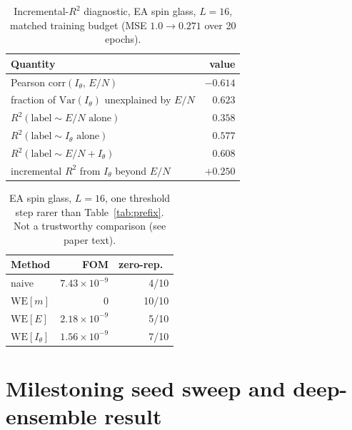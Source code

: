 \documentclass[11pt]{article}
\begin{document}
\begin{table}[h]
	\centering\small
	\caption{Incremental-$R^2$ diagnostic, EA spin glass, $L=16$, matched training budget
		(MSE $1.0\to0.271$ over 20 epochs).}
	\label{tab:diagnostic}
	\begin{tabular}{lr}
		\toprule
		Quantity & value \\
		\midrule
		Pearson corr$(I_\theta,\,E/N)$ & $-0.614$ \\
		fraction of $\mathrm{Var}(I_\theta)$ unexplained by $E/N$ & $0.623$ \\
		$R^2(\text{label}\sim E/N\text{ alone})$ & $0.358$ \\
		$R^2(\text{label}\sim I_\theta\text{ alone})$ & $0.577$ \\
		$R^2(\text{label}\sim E/N+I_\theta)$ & $0.608$ \\
		incremental $R^2$ from $I_\theta$ beyond $E/N$ & $+0.250$ \\
		\bottomrule
	\end{tabular}
\end{table}

\begin{table}[h]
	\centering\small
	\caption{EA spin glass, $L=16$, one threshold step rarer than Table~\ref{tab:prefix}. Not a
		trustworthy comparison (see paper text).}
	\label{tab:beyond2}
	\begin{tabular}{lrr}
		\toprule
		Method & FOM & zero-rep.\ \\
		\midrule
		naive & $7.43\times10^{-9}$ & 4/10 \\
		$\mathrm{WE}[m]$ & $0$ & 10/10 \\
		$\mathrm{WE}[E]$ & $2.18\times10^{-9}$ & 5/10 \\
		$\mathrm{WE}[I_\theta]$ & $1.56\times10^{-9}$ & 7/10 \\
		\bottomrule
	\end{tabular}
\end{table}

\section{Milestoning seed sweep and deep-ensemble result}
\end{document}

